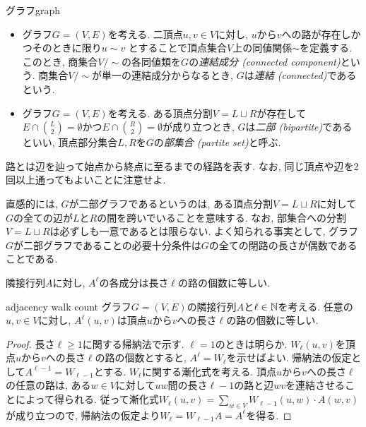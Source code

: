 \begin{definition}{グラフ}{graph}
\begin{itemize}
    \item グラフ$G=(V,E)$を考える.
          二頂点$u,v \in V$に対し,
          $u$から$v$への路が存在しかつそのときに限り$u\sim v$
          とすることで頂点集合$V$上の同値関係$\sim$を定義する.
          このとき, 商集合$V / \sim$の各同値類を$G$の\emph{連結成分 (connected component)}という.
          商集合$V / \sim$が単一の連結成分からなるとき, $G$は\emph{連結 (connected)}であるという.
    \item   グラフ$G=(V,E)$を考える.
          ある頂点分割$V=L\sqcup R$が存在して$E\cap \binom{L}{2}=\emptyset$かつ$E\cap \binom{R}{2}=\emptyset$が成り立つとき, $G$は\emph{二部 (bipartite)}であるといい,
          頂点部分集合$L,R$を$G$の\emph{部集合 (partite set)}と呼ぶ.
  \end{itemize}
\end{definition}
路とは辺を辿って始点から終点に至るまでの経路を表す.
なお, 同じ頂点や辺を2回以上通ってもよいことに注意せよ.

直感的には, $G$が二部グラフであるというのは, ある頂点分割$V=L\sqcup R$に対して
$G$の全ての辺が$L$と$R$の間を跨いでいることを意味する.
なお, 部集合への分割$V = L\sqcup R$は必ずしも一意であるとは限らない.
よく知られる事実として, グラフ$G$が二部グラフであることの必要十分条件は$G$の全ての閉路の長さが偶数であることである.

隣接行列$A$に対し, $A^\ell$の各成分は長さ$\ell$の路の個数に等しい.
\begin{lemma}{}{adjacency walk count}
  グラフ$G=(V,E)$の隣接行列$A$と$\ell\in\mathbb{N}$を考える.
  任意の$u,v\in V$に対し, $A^\ell(u,v)$は頂点$u$から$v$への長さ$\ell$の路の個数に等しい.
\end{lemma}
\begin{proof}
  長さ$\ell\ge 1$に関する帰納法で示す. $\ell=1$のときは明らか.
  $W_\ell(u,v)$を頂点$u$から$v$への長さ$\ell$の路の個数とすると, $A^\ell = W_\ell$を示せばよい.
  帰納法の仮定として$A^{\ell - 1} = W_{\ell - 1}$とする.
  $W_{\ell}$に関する漸化式を考える.
  頂点$u$から$v$への長さ$\ell$の任意の路は,
  ある$w\in V$に対して$uw$間の長さ$\ell-1$の路と辺$wv$を連結させることによって得られる.
  従って漸化式$W_\ell(u,v) = \sum_{w \in V} W_{\ell-1}(u,w) \cdot A(w,v)$が成り立つので, 帰納法の仮定より$W_\ell = W_{\ell-1}A = A^\ell$を得る.
\end{proof}

